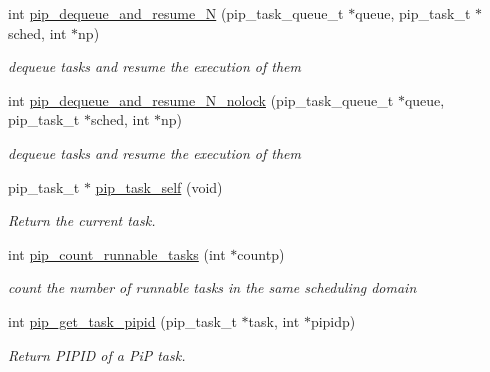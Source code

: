\begin{DoxyCompactItemize}
\item 
int \hyperlink{group__libpip_gac26e54557d8e89fcdcb52a9df6c65998}{pip\-\_\-dequeue\-\_\-and\-\_\-resume\-\_\-\-N} (pip\-\_\-task\-\_\-queue\-\_\-t $\ast$queue, pip\-\_\-task\-\_\-t $\ast$sched, int $\ast$np)
\begin{DoxyCompactList}\small\item\em dequeue tasks and resume the execution of them \end{DoxyCompactList}\end{DoxyCompactItemize}
\begin{DoxyCompactItemize}
\item 
int \hyperlink{group__libpip_ga939e70924803be491c2f6f10b364e803}{pip\-\_\-dequeue\-\_\-and\-\_\-resume\-\_\-\-N\-\_\-nolock} (pip\-\_\-task\-\_\-queue\-\_\-t $\ast$queue, pip\-\_\-task\-\_\-t $\ast$sched, int $\ast$np)
\begin{DoxyCompactList}\small\item\em dequeue tasks and resume the execution of them \end{DoxyCompactList}\end{DoxyCompactItemize}
\begin{DoxyCompactItemize}
\item 
pip\-\_\-task\-\_\-t $\ast$ \hyperlink{group__libpip_gaf09a1abfd580696c74d4aa7be8255ad0}{pip\-\_\-task\-\_\-self} (void)
\begin{DoxyCompactList}\small\item\em Return the current task. \end{DoxyCompactList}\end{DoxyCompactItemize}
\begin{DoxyCompactItemize}
\item 
int \hyperlink{group__libpip_gaec396f9ee279cbe2d44f9b2ed239eb4a}{pip\-\_\-count\-\_\-runnable\-\_\-tasks} (int $\ast$countp)
\begin{DoxyCompactList}\small\item\em count the number of runnable tasks in the same scheduling domain \end{DoxyCompactList}\end{DoxyCompactItemize}
\begin{DoxyCompactItemize}
\item 
int \hyperlink{group__libpip_ga14a1b03ec6564885a5dd97dbc27167aa}{pip\-\_\-get\-\_\-task\-\_\-pipid} (pip\-\_\-task\-\_\-t $\ast$task, int $\ast$pipidp)
\begin{DoxyCompactList}\small\item\em Return P\-I\-P\-I\-D of a Pi\-P task. \end{DoxyCompactList}\end{DoxyCompactItemize}
